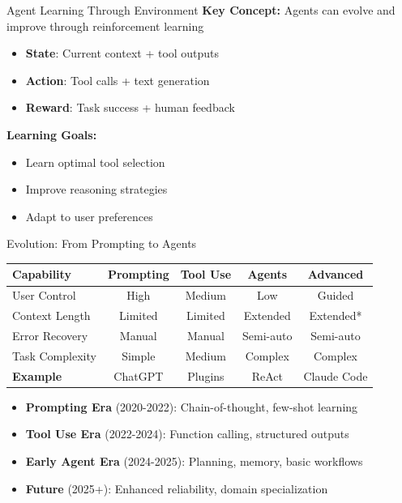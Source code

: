 \documentclass[aspectratio=169]{beamer}
\begin{document}
\begin{frame}{Agent Learning Through Environment}
	\textbf{Key Concept:} Agents can evolve and improve through reinforcement learning
	
	\vspace{0.5cm}
	
	\begin{itemize}
		\item {\color{highlight}\textbf{State}}: Current context + tool outputs
		\item {\color{highlight}\textbf{Action}}: Tool calls + text generation
		\item {\color{highlight}\textbf{Reward}}: Task success + human feedback
	\end{itemize}
	
	\vspace{0.5cm}
	
	\textbf{Learning Goals:}
	\begin{itemize}
		\item Learn optimal tool selection
		\item Improve reasoning strategies  
		\item Adapt to user preferences
	\end{itemize}
\end{frame}

\begin{frame}{Evolution: From Prompting to Agents}
	\begin{center}
		\begin{tabular}{|l|c|c|c|c|}
			\hline
			\textbf{Capability} & \textbf{Prompting} & \textbf{Tool Use} & \textbf{Agents} & \textbf{Advanced} \\
			\hline
			User Control & High & Medium & Low & Guided \\
			Context Length & Limited & Limited & Extended & Extended* \\
			Error Recovery & Manual & Manual & Semi-auto & Semi-auto \\
			Task Complexity & Simple & Medium & Complex & Complex \\
			\hline
			\textbf{Example} & ChatGPT & Plugins & ReAct & Claude Code \\
			\hline
		\end{tabular}
	\end{center}
	
	\vspace{0.5cm}
	
	\begin{itemize}
		\item {\color{highlight}\textbf{Prompting Era}} (2020-2022): Chain-of-thought, few-shot learning
		\item {\color{highlight}\textbf{Tool Use Era}} (2022-2024): Function calling, structured outputs
		\item {\color{highlight}\textbf{Early Agent Era}} (2024-2025): Planning, memory, basic workflows
		\item {\color{highlight}\textbf{Future}} (2025+): Enhanced reliability, domain specialization
	\end{itemize}
	
\end{frame}
\end{document}

